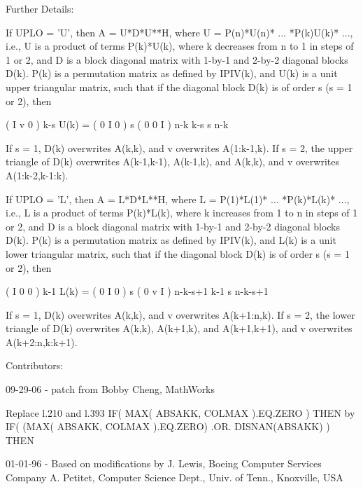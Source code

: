 \begin{DoxyParagraph}{Further Details\+: }
\begin{DoxyVerb}  If UPLO = 'U', then A = U*D*U**H, where
     U = P(n)*U(n)* ... *P(k)U(k)* ...,
  i.e., U is a product of terms P(k)*U(k), where k decreases from n to
  1 in steps of 1 or 2, and D is a block diagonal matrix with 1-by-1
  and 2-by-2 diagonal blocks D(k).  P(k) is a permutation matrix as
  defined by IPIV(k), and U(k) is a unit upper triangular matrix, such
  that if the diagonal block D(k) is of order s (s = 1 or 2), then

             (   I    v    0   )   k-s
     U(k) =  (   0    I    0   )   s
             (   0    0    I   )   n-k
                k-s   s   n-k

  If s = 1, D(k) overwrites A(k,k), and v overwrites A(1:k-1,k).
  If s = 2, the upper triangle of D(k) overwrites A(k-1,k-1), A(k-1,k),
  and A(k,k), and v overwrites A(1:k-2,k-1:k).

  If UPLO = 'L', then A = L*D*L**H, where
     L = P(1)*L(1)* ... *P(k)*L(k)* ...,
  i.e., L is a product of terms P(k)*L(k), where k increases from 1 to
  n in steps of 1 or 2, and D is a block diagonal matrix with 1-by-1
  and 2-by-2 diagonal blocks D(k).  P(k) is a permutation matrix as
  defined by IPIV(k), and L(k) is a unit lower triangular matrix, such
  that if the diagonal block D(k) is of order s (s = 1 or 2), then

             (   I    0     0   )  k-1
     L(k) =  (   0    I     0   )  s
             (   0    v     I   )  n-k-s+1
                k-1   s  n-k-s+1

  If s = 1, D(k) overwrites A(k,k), and v overwrites A(k+1:n,k).
  If s = 2, the lower triangle of D(k) overwrites A(k,k), A(k+1,k),
  and A(k+1,k+1), and v overwrites A(k+2:n,k:k+1).\end{DoxyVerb}
 
\end{DoxyParagraph}
\begin{DoxyParagraph}{Contributors\+: }
\begin{DoxyVerb}  09-29-06 - patch from
    Bobby Cheng, MathWorks

    Replace l.210 and l.393
         IF( MAX( ABSAKK, COLMAX ).EQ.ZERO ) THEN
    by
         IF( (MAX( ABSAKK, COLMAX ).EQ.ZERO) .OR. DISNAN(ABSAKK) ) THEN

  01-01-96 - Based on modifications by
    J. Lewis, Boeing Computer Services Company
    A. Petitet, Computer Science Dept., Univ. of Tenn., Knoxville, USA\end{DoxyVerb}
 
\end{DoxyParagraph}
